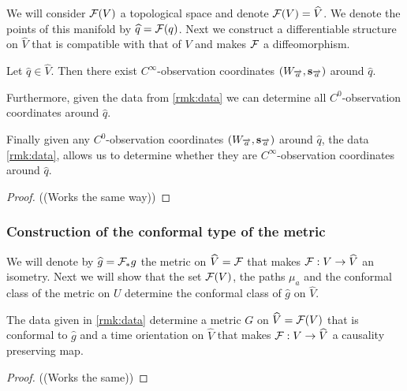We will consider $\mc{F}(V)$ a topological space and denote $\mc{F}(V)=\widehat{V}$. We denote the points of this manifold by $\widehat{q}=\mc{F}(q)$. Next we construct a differentiable structure on $\widehat{V}$ that is compatible with that of $V$ and makes $\F$ a diffeomorphism.

\begin{proposition}\label{prop:findsmoothcoords}
Let  $\widehat{q}\in \widehat{V}$. 
Then there exist $C^\infty$-observation coordinates $(W_\aa,\mathbf{s}_\aa)$ around $\widehat{q}$.

Furthermore, given the data from \ref{rmk:data} we can determine all $C^0$-observation coordinates around $\widehat{q}$.

Finally given any $C^0$-observation coordinates $(W_\aa,\mathbf{s}_\aa)$ around $\widehat{q}$, the data \ref{rmk:data}, allows us to determine whether they are $C^\infty$-observation coordinates around $\widehat{q}$.
\end{proposition}
\begin{proof}
((Works the same way))
\end{proof}

\subsubsection{Construction of the conformal type of the metric}
We will denote by $\widehat{g}=\F_*g$ the metric on $\widehat{V}=\F$ that makes $\F:V\to \widehat{V}$ an isometry. Next we will show that the set $\F(V)$, the paths $\mu_a$ and the conformal class of the metric on $U$ determine the conformal class of $\widehat{g}$ on $\widehat{V}$.

\begin{lemma}\label{lem:constructmetric}
The data given in \ref{rmk:data} determine a metric $G$ on $\widehat{V}=\F(V)$ that is conformal to $\widehat{g}$ and a time orientation on $\widehat{V}$ that makes $\F:V\to \widehat{V}$ a causality preserving map.
\end{lemma}
\begin{proof}
((Works the same))
\end{proof}